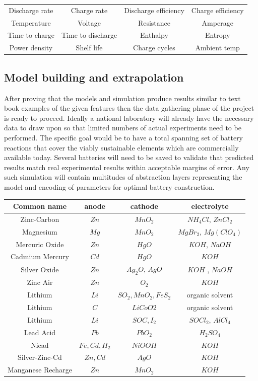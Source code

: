 \documentclass{article}
\begin{document}
\noindent
\begin{tabular}{| c c c c|}
	\hline
	Discharge rate & Charge rate & Discharge efficiency & Charge efficiency \\
	Temperature & Voltage & Resistance & Amperage \\
	Time to charge & Time to discharge & Enthalpy & Entropy\\
	Power density & Shelf life & Charge cycles & Ambient temp \\
	\hline
\end{tabular}	




\subsection{Model building and extrapolation}
After proving that the models and simulation produce results similar to text book examples of the given features then the data gathering phase of the project is ready to proceed.  Ideally a national laboratory will already have the necessary data to draw upon so that limited numbers of actual experiments need to be performed. The specific goal would be to have a total spanning set of battery reactions that cover the viably sustainable elements which are commercially available today. Several batteries will need to be saved to validate that predicted results match real experimental results within acceptable margins of error. Any such simulation will contain multitudes of abstraction layers representing the model and encoding of parameters for optimal battery construction.  \\

\noindent
\begin{tabular}{| c c c c |}
	\hline
	Common name & anode & cathode & electrolyte \\
	\hline
	Zinc-Carbon & $Zn$ & $MnO_2$ & $NH_4Cl$, $ZnCl_2$\\
	Magnesium & $Mg$ & $MnO_2$ & $MgBr_2$, $Mg(ClO_4)$ \\
	Mercuric Oxide & $Zn$ & $HgO$ & $KOH$, $NaOH$ \\
	Cadmium Mercury & $Cd$ & $HgO$ & $KOH$ \\
	Silver Oxide & $Zn$ & $Ag_2O$, $AgO$ & $KOH$ , $NaOH$\\
	Zinc Air & $Zn$ & $O_2$ & $KOH$ \\
	Lithium & $Li$ & $SO_2,MnO_2,FeS_2$ & organic solvent \\
	Lithium & $C$ & $LiCoO2$ & organic solvent\\
	Lithium & $Li$ & $SOC,I_2$ & $SOCl_2$, $AlCl_4$ \\
	Lead Acid & $Pb$ & $PbO_2$ & $H_2SO_4$ \\
	Nicad & $Fe,Cd,H_2$ & $NiOOH$ & $KOH$ \\
	Silver-Zinc-Cd & $Zn,Cd$ & $AgO$ & $KOH$ \\
	Manganese Recharge & $Zn$ & $MnO_2$ & $KOH$ \\
	\hline	
\end{tabular}
\end{document}
